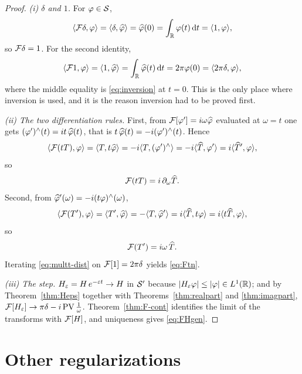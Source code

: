 \begin{proof}
\emph{(i) $\delta$ and $1$.} For $\varphi\in\mathcal{S}$,
\begin{equation}
\langle \mathcal{F}\delta,\varphi\rangle=\langle \delta,\widehat{\varphi}\rangle=\widehat{\varphi}(0)=\int_{\mathbb{R}}\varphi(t)\,\mathrm{d} t=\langle 1,\varphi\rangle,
\end{equation}
so $\mathcal{F}\delta=1$. For the second identity,
\begin{equation}
\langle \mathcal{F}1,\varphi\rangle=\langle 1,\widehat{\varphi}\rangle=\int_{\mathbb{R}}\widehat{\varphi}(t)\,\mathrm{d} t=2\pi\varphi(0)=\langle 2\pi\delta,\varphi\rangle,
\end{equation}
where the middle equality is \eqref{eq:inversion} at $t=0$. This is the only place where inversion is
used, and it is the reason inversion had to be proved first.

\emph{(ii) The two differentiation rules.} First, from $\mathcal{F}[\varphi']=i\omega\widehat{\varphi}$ evaluated at
$\omega=t$ one gets $(\varphi')^{\wedge}(t)=it\,\widehat{\varphi}(t)$, that is
$t\,\widehat{\varphi}(t)=-i(\varphi')^{\wedge}(t)$. Hence
\begin{equation}
\langle \mathcal{F}(tT),\varphi\rangle=\langle T,t\widehat{\varphi}\rangle
=-i\langle T,(\varphi')^{\wedge}\rangle
=-i\langle \widehat T,\varphi'\rangle
=i\langle \widehat T',\varphi\rangle,
\end{equation}
so
\begin{equation}
\mathcal{F}(tT)=i\,\partial_{\omega}\widehat T .
\label{eq:multt-dist}
\end{equation}
Second, from $\widehat{\varphi}'(\omega)=-i(t\varphi)^{\wedge}(\omega)$,
\begin{equation}
\langle \mathcal{F}(T'),\varphi\rangle=\langle T',\widehat{\varphi}\rangle=-\langle T,\widehat{\varphi}'\rangle
=i\langle \widehat T,t\varphi\rangle
=i\langle t\widehat T,\varphi\rangle,
\end{equation}
so
\begin{equation}
\mathcal{F}(T')=i\omega\,\widehat T .
\label{eq:deriv-dist}
\end{equation}
Iterating \eqref{eq:multt-dist} on $\mathcal{F}[1]=2\pi\delta$ yields \eqref{eq:Ftn}.

\emph{(iii) The step.} $H_{\varepsilon}=H\,e^{-\varepsilon t}\to H$ in $\mathcal{S}'$ because
$|H_{\varepsilon}\varphi|\le|\varphi|\in L^{1}(\mathbb{R})$; and by Theorem~\ref{thm:Heps} together with
Theorems~\ref{thm:realpart} and \ref{thm:imagpart},
$\mathcal{F}[H_{\varepsilon}]\to\pi\delta-i\operatorname{PV}\frac{1}{\omega}$. Theorem~\ref{thm:F-cont} identifies the limit of the
transforms with $\mathcal{F}[H]$, and uniqueness gives \eqref{eq:FHgen}.
\end{proof}

\section{Other regularizations}

